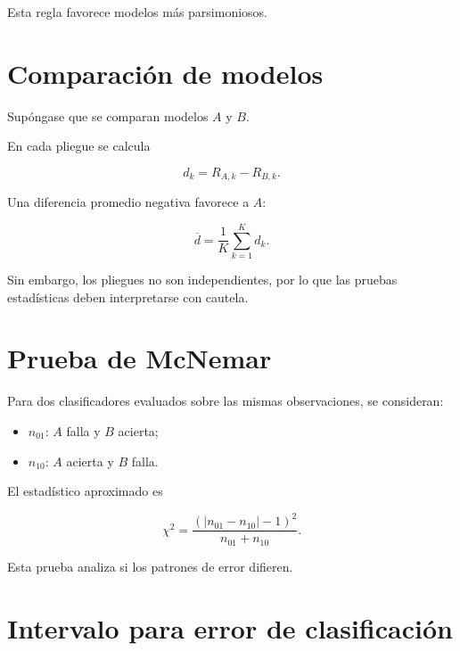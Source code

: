 \documentclass[
  spanish,
  10.5pt,
  letterpaper,
  DIV=11,
  numbers=noendperiod,
  oneside,
  open=any]{scrreprt}
\providecommand{\tightlist}{%
  \setlength{\itemsep}{0pt}\setlength{\parskip}{0pt}}
\theoremstyle{definition}
\theoremstyle{definition}
\theoremstyle{plain}
\theoremstyle{remark}
\begin{document}
Esta regla favorece modelos más parsimoniosos.

\section*{Comparación de modelos}\label{comparaciuxf3n-de-modelos}


Supóngase que se comparan modelos \(A\) y \(B\).

En cada pliegue se calcula

\[
d_k
=
R_{A,k}
-
R_{B,k}.
\]

Una diferencia promedio negativa favorece a \(A\):

\[
\overline{d}
=
\frac{1}{K}
\sum_{k=1}^{K}d_k.
\]

Sin embargo, los pliegues no son independientes, por lo que las pruebas
estadísticas deben interpretarse con cautela.

\section*{Prueba de McNemar}\label{prueba-de-mcnemar}


Para dos clasificadores evaluados sobre las mismas observaciones, se
consideran:

\begin{itemize}
\tightlist
\item
  \(n_{01}\): \(A\) falla y \(B\) acierta;
\item
  \(n_{10}\): \(A\) acierta y \(B\) falla.
\end{itemize}

El estadístico aproximado es

\[
\chi^2
=
\frac{
(|n_{01}-n_{10}|-1)^2
}{
n_{01}+n_{10}
}.
\]

Esta prueba analiza si los patrones de error difieren.

\section*{Intervalo para error de
clasificación}\label{intervalo-para-error-de-clasificaciuxf3n}

\end{document}
